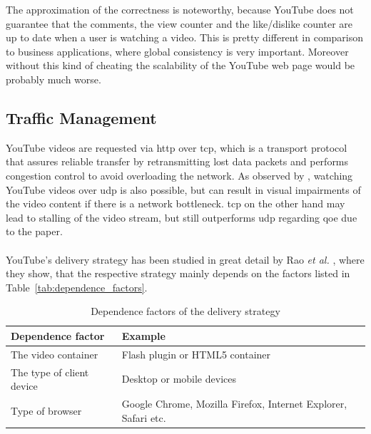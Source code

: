 The approximation of the correctness is noteworthy, because YouTube does not guarantee that the comments, the view counter and the like/dislike counter are up to date when a user is watching a video. This is pretty different in comparison to business applications, where global consistency is very important. Moreover without this kind of cheating the scalability of the YouTube web page would be probably much worse.

\subsection{Traffic Management}

YouTube videos are requested via \gls{http} over \gls{tcp}, which is a transport protocol that assures reliable transfer by retransmitting lost data packets and performs congestion control to avoid overloading the network. As observed by \cite{inc:transport_protocols}, watching YouTube videos over \gls{udp} is also possible, but can result in visual impairments of the video content if there is a network bottleneck. \gls{tcp} on the other hand may lead to stalling of the video stream, but still outperforms \gls{udp} regarding \gls{qoe} due to the paper. \\
\\
YouTube's delivery strategy has been studied in great detail by Rao \emph{et al.} \cite{inp:network_characteristics}, where they show, that the respective strategy mainly depends on the factors listed in Table~\vref{tab:dependence_factors}.\\

\begin{table}[htbp]
  \begin{center}
    \begin{tabularx}{\textwidth}{|l|X|}
      \hline
      \textbf{Dependence factor} & \textbf{Example} \\
      \hline
      \hline
      The video container & Flash plugin or HTML5 container \\
      \hline
      The type of client device & Desktop or mobile devices \\
      \hline 
      Type of browser & Google Chrome, Mozilla Firefox, Internet Explorer, Safari etc. \\
      \hline
    \end{tabularx}
    \caption{Dependence factors of the delivery strategy}
    \label{tab:dependence_factors}
  \end{center}
\end{table}

